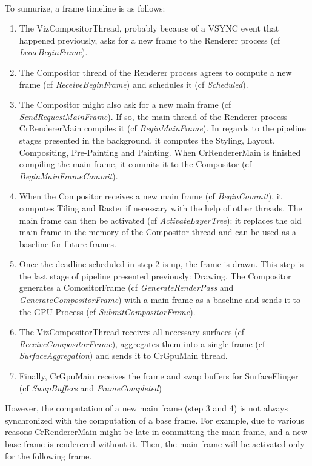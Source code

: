 \documentclass{kththesis}
\begin{document}
\paragraph{}
To sumurize, a frame timeline is as follows:
\begin{enumerate}
    \item The VizCompositorThread, probably because of a VSYNC event that happened previously, asks for a new frame to the Renderer process (cf \textit{IssueBeginFrame}).
    \item The Compositor thread of the Renderer process agrees to compute a new frame (cf \textit{ReceiveBeginFrame}) and schedules it (cf \textit{Scheduled}).
    \item The Compositor might also ask for a new main frame (cf \textit{SendRequestMainFrame}). If so, the main thread of the Renderer process CrRendererMain compiles it (cf \textit{BeginMainFrame}). In regards to the pipeline stages presented in the background, it computes the Styling, Layout, Compositing, Pre-Painting and Painting. When CrRendererMain is finished compiling the main frame, it commits it to the Compositor (cf \textit{BeginMainFrameCommit}).
    \item When the Compositor receives a new main frame (cf \textit{BeginCommit}), it computes Tiling and Raster if necessary with the help of other threads. The main frame can then be activated (cf \textit{ActivateLayerTree}): it replaces the old main frame in the memory of the Compositor thread and can be used as a baseline for future frames.
    \item Once the deadline scheduled in step 2 is up, the frame is drawn. This step is the last stage of pipeline presented previously: Drawing. The Compositor generates a ComositorFrame (cf \textit{GenerateRenderPass} and \textit{GenerateCompositorFrame}) with a main frame as a baseline and sends it to the GPU Process (cf \textit{SubmitCompositorFrame}).
    \item The VizCompositorThread receives all necessary surfaces (cf \textit{ReceiveCompositorFrame}), aggregates them into a single frame (cf \textit{SurfaceAggregation}) and sends it to CrGpuMain thread.
    \item Finally, CrGpuMain receives the frame and swap buffers for SurfaceFlinger (cf \textit{SwapBuffers} and \textit{FrameCompleted})
\end{enumerate}

However, the computation of a new main frame (step 3 and 4) is not always synchronized with the computation of a base frame. For example, due to various reasons CrRendererMain might be late in committing the main frame, and a new base frame is renderered without it. Then, the main frame will be activated only for the following frame.
\end{document}
